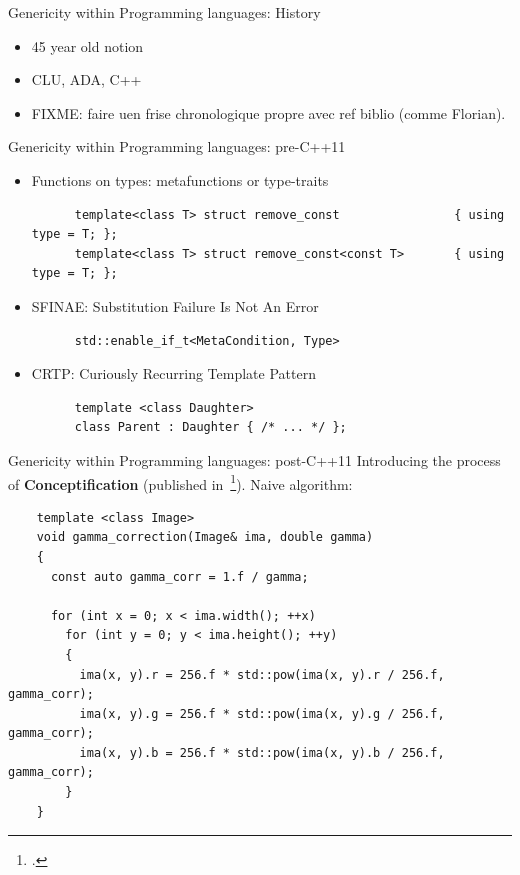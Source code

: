 \documentclass[12pt,aspectratio=169]{beamer}
\begin{document}
\begin{frame}[fragile]{Genericity within Programming languages: History}
  \begin{itemize}
    \item 45 year old notion
    \item CLU, ADA, C++
    \item FIXME: faire uen frise chronologique propre avec ref biblio (comme Florian).
  \end{itemize}
\end{frame}

\begin{frame}[fragile]{Genericity within Programming languages: pre-C++11}
  \begin{itemize}
    \item Functions on types: metafunctions or type-traits
          \begin{verbatim}
      template<class T> struct remove_const                { using type = T; };
      template<class T> struct remove_const<const T>       { using type = T; };
    \end{verbatim}
    \item SFINAE: Substitution Failure Is Not An Error
          \begin{verbatim}
      std::enable_if_t<MetaCondition, Type>
    \end{verbatim}
    \item CRTP: Curiously Recurring Template Pattern
          \begin{verbatim}
      template <class Daughter>
      class Parent : Daughter { /* ... */ };
    \end{verbatim}
  \end{itemize}
\end{frame}

\begin{frame}[fragile]{Genericity within Programming languages: post-C++11}
  Introducing the process of \textbf{Conceptification} (published in~\footcite{roynard.2019.rrpr}).
  \vfill
  Naive algorithm:
  \begin{verbatim}
    template <class Image>
    void gamma_correction(Image& ima, double gamma)
    {
      const auto gamma_corr = 1.f / gamma;
    
      for (int x = 0; x < ima.width(); ++x)
        for (int y = 0; y < ima.height(); ++y)
        {
          ima(x, y).r = 256.f * std::pow(ima(x, y).r / 256.f, gamma_corr);
          ima(x, y).g = 256.f * std::pow(ima(x, y).g / 256.f, gamma_corr);
          ima(x, y).b = 256.f * std::pow(ima(x, y).b / 256.f, gamma_corr);
        }
    }
  \end{verbatim}
\end{frame}
\end{document}
